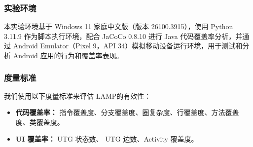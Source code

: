 \documentclass[twocolumn, 10pt]{article}
\newcommand{\lamp}{L{\small\MakeUppercase{amp}}}
\begin{document}
\subsubsection{实验环境}

本实验环境基于 Windows 11 家庭中文版（版本 26100.3915），使用 Python 3.11.9 作为脚本执行环境，配合 JaCoCo 0.8.10 进行 Java 代码覆盖率分析，并通过 Android Emulator（Pixel 9，API 34）模拟移动设备运行环境，用于测试和分析 Android 应用的行为和覆盖率表现。

\subsubsection{度量标准}
\label{sec:metrics}

我们使用以下度量标准来评估 \lamp 的有效性：

\begin{itemize}[noitemsep]
    \item \textbf{代码覆盖率：} 指令覆盖度、分支覆盖度、圈复杂度、行覆盖度、方法覆盖度、类覆盖度。
    \item \textbf{UI 覆盖率：} UTG 状态数、 UTG 边数、Activity 覆盖度。
\end{itemize}
\end{document}
